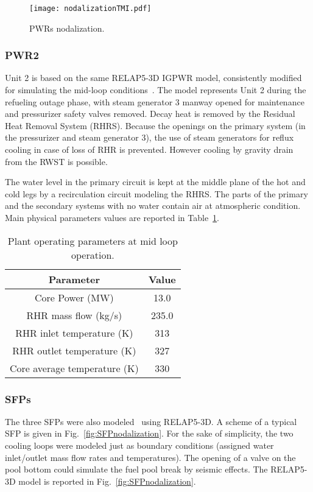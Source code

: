 \begin{figure}
    \centering
    \texttt{[image: nodalizationTMI.pdf]}
    \caption{PWRs nodalization.}
    \label{fig:PWRnodalization}
\end{figure}

\subsubsection{PWR2}
Unit 2 is based on the same RELAP5-3D IGPWR model, consistently modified for simulating the 
mid-loop conditions~\cite{NUREGCR6144}. The model represents Unit 2 
during the refueling outage phase, with steam generator 3 manway opened for maintenance and pressurizer safety 
valves removed. Decay heat is removed by the Residual Heat Removal System (RHRS). Because the 
openings on the primary system (in the pressurizer and steam generator 3), the use of steam generators 
for reflux cooling in case 
of loss of RHR is prevented. However cooling by gravity drain from the RWST is possible.

The water level in the primary circuit is kept at the middle plane of the hot and cold legs 
by a recirculation circuit modeling the RHRS. 
The parts of the primary and the secondary systems with no water contain air at atmospheric condition.  
Main physical parameters values are reported in Table~\ref{tab:midLoopParamteres}.

\begin{table}
   \centering
   \begin{tabular}{|c|c|}
     \hline
     \textbf{Parameter}           & \textbf{Value}   \\ \hline \hline
     Core Power (MW)              & 13.0    \\ \hline
     RHR mass flow (kg/s)         & 235.0   \\ \hline
     RHR inlet temperature (K)    & 313     \\ \hline
     RHR outlet temperature (K)   & 327     \\ \hline
     Core average temperature (K) & 330     \\ \hline
  \end{tabular}
  \caption{Plant operating parameters at mid loop operation.}
  \label{tab:midLoopParamteres}
\end{table} 

\subsubsection{SFPs}
The three SFPs were also modeled~\cite{parisiExternalAnalysis} using RELAP5-3D. 
A scheme of a typical SFP is given in Fig.~\ref{fig:SFPnodalization}. 
For the sake of simplicity, the two cooling loops were modeled just as boundary conditions 
(assigned water inlet/outlet mass flow rates and temperatures). The opening of a valve on the pool bottom
could simulate the fuel pool break by seismic effects. The RELAP5-3D model is reported in Fig.~\ref{fig:SFPnodalization}.

